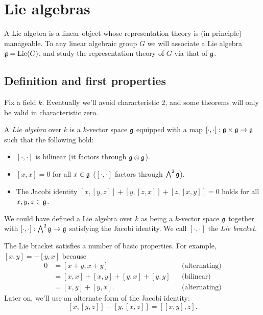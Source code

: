 
\section{Lie algebras}





A Lie algebra is a linear object whose representation theory is (in 
principle) manageable. To any linear algebraic group $G$ we will associate a 
Lie algebra $\mathfrak{g}=\operatorname{Lie}(G)$, and study the representation theory of $G$ via that 
of $\mathfrak{g}$. 





\subsection{Definition and first properties}

Fix a field $k$. Eventually we'll avoid characteristic $2$, and some theorems 
will only be valid in characteristic zero. 

\begin{definition}
A \emph{Lie algebra} over $k$ is a $k$-vector space $\mathfrak{g}$ equipped with a map 
$[\cdot,\cdot]:\mathfrak{g}\times \mathfrak{g}\to \mathfrak{g}$ such that the following hold:
\begin{itemize}
  \item $[\cdot,\cdot]$ is bilinear (it factors through $\mathfrak{g}\otimes\mathfrak{g}$). 
  \item $[x,x]=0$ for all $x\in \mathfrak{g}$ ($[\cdot,\cdot]$ factors through 
    $\bigwedge^2 \mathfrak{g}$).
  \item The Jacobi identity $[x,[y,z]]+[y,[z,x]]+[z,[x,y]]=0$ holds for all 
    $x,y,z\in \mathfrak{g}$.  
\end{itemize}
\end{definition}

We could have defined a Lie algebra over $k$ as being a $k$-vector space 
$\mathfrak{g}$ together with $[\cdot,\cdot]:\bigwedge^2 \mathfrak{g}\to \mathfrak{g}$ satisfying the 
Jacobi identity. We call $[\cdot,\cdot]$ the \emph{Lie bracket}. 

The Lie bracket satisfies a number of basic properties. For example, 
$[x,y]=-[y,x]$ because 
\begin{align*}
  0 &= [x+y,x+y] && \text{(alternating)} \\
    &= [x,x]+[x,y]+[y,x]+[y,y] && \text{(bilinear)} \\
    &= [x,y] + [y,x] . && \text{(alternating)}
\end{align*}
Later on, we'll use an alternate form of the Jacobi identity: 
\begin{equation*}\label{eq:jac-ident}\tag{$*$}
  [x,[y,z]]-[y,[x,z]] = [[x,y],z] .
\end{equation*}





